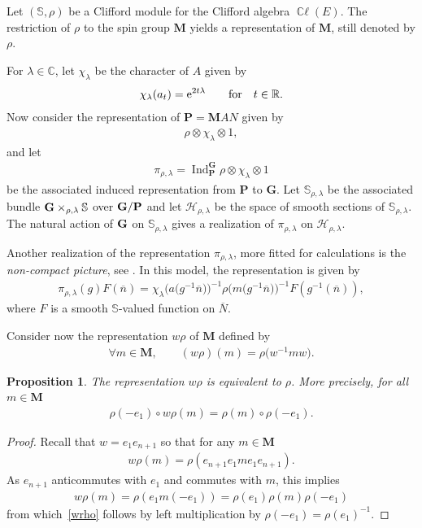 \documentclass[pdftex]{sigma}
\DeclareMathOperator{\ccl}{\mathbb{C}\ell} %
\DeclareMathOperator{\Ind}{Ind}
\numberwithin{equation}{section}
\newtheorem{prop}[theor]{Proposition}
\begin{document}
Let $(\mathbb S, \rho)$ be a Clifford module for the Clifford algebra $\ccl(E)$. The restriction of $\rho$ to the spin group $\mathbf M$ yields a representation of $\mathbf M$, still denoted by $\rho$.

For $\lambda\in \mathbb C$, let $\chi_\lambda$ be the character of $A$ given by
\begin{gather*}
\chi_\lambda(a_t) = {\rm e}^{2t\lambda}\qquad \text {for}\quad t\in \mathbb R .
\end{gather*}
Now consider the representation
 of $\mathbf P= \mathbf M AN$ given by
\begin{gather*}
\rho\otimes \chi_\lambda\otimes 1,
\end{gather*}
and let
\begin{gather*}
\pi_{\rho,\lambda} = \Ind_{\mathbf P}^{\mathbf G} \rho\otimes \chi_\lambda\otimes 1
\end{gather*}
be the associated induced representation from $\mathbf P$ to $\mathbf G$. Let $\mathbb S_{\rho, \lambda}$ be the associated bundle $\bf G\times_{\rho,\lambda} \mathbb S$ over $\bf G/\bf P$ and let $\mathcal H_{\rho, \lambda}$ be the space of smooth sections of $ \mathbb S_{\rho, \lambda}$. The natural action of $\bf G$ on $\mathbb S_{\rho, \lambda}$
gives a realization of $\pi_{\rho, \lambda}$ on $\mathcal H_{\rho, \lambda}$.

Another realization of the representation $\pi_{\rho, \lambda}$, more fitted for calculations is the \emph{non-compact picture}, see \cite[Chapter VII]{kn}. In this model, the representation is given by
\begin{gather*}
\pi_{\rho,\lambda} (g) F (\overline n) = {\chi_\lambda\big(a\big(g^{-1}\overline n\big)\big)^{-1}} \rho\big(m\big(g^{-1}\overline n\big)\big)^{-1} F\left(g^{-1}(\overline n)\right)\!,
\end{gather*}
where $F$ is a smooth $\mathbb S$-valued function on $\overline N$.

Consider now the representation $w\rho$ of $\mathbf M$ defined by
\begin{gather*}
\forall m\in \mathbf M,\qquad (w\rho)(m) = \rho\big(w^{-1} m w\big) .
\end{gather*}
\begin{prop} \label{wrhoeqrho}
The representation $w \rho$ is equivalent to $ \rho$. More precisely, for all $m\in \mathbf M$
\begin{gather}\label{wrho}
 \rho(-e_1)\circ w \rho(m) = \rho(m)\circ \rho(-e_1) .
\end{gather}
\end{prop}
\begin{proof}
Recall that $w=e_1e_{n+1}$ so that for any $m\in \mathbf M$
\begin{gather*}
w\rho(m) = \rho(e_{n+1} e_1me_1 e_{n+1}) .
\end{gather*}
As $e_{n+1}$ anticommutes with $e_1$ and commutes with $m$, this implies
\begin{gather*}
w\rho(m) = \rho(e_1m(-e_1))= \rho(e_1) \rho(m) \rho(-e_1)\end{gather*}
from which~\eqref{wrho} follows by left multiplication by $ \rho(-e_1)= \rho(e_1)^{-1}$.
\end{proof}
\end{document}
